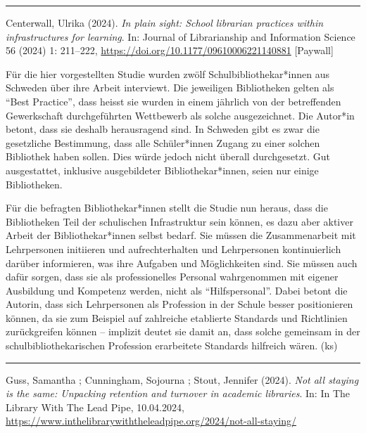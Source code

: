 \documentclass[a4paper,
fontsize=11pt,
oneside,
numbers=noperiodatend,
parskip=half-,
bibliography=totoc,
final
]{scrartcl}
\begin{document}
\begin{center}\rule{0.5\linewidth}{0.5pt}\end{center}

Centerwall, Ulrika (2024). \emph{In plain sight: School librarian
practices within infrastructures for learning}. In: Journal of
Librarianship and Information Science 56 (2024) 1: 211--222,
\url{https://doi.org/10.1177/09610006221140881} {[}Paywall{]}

Für die hier vorgestellten Studie wurden zwölf Schulbibliothekar*innen
aus Schweden über ihre Arbeit interviewt. Die jeweiligen Bibliotheken
gelten als \enquote{Best Practice}, dass heisst sie wurden in einem
jährlich von der betreffenden Gewerkschaft durchgeführten Wettbewerb als
solche ausgezeichnet. Die Autor*in betont, dass sie deshalb herausragend
sind. In Schweden gibt es zwar die gesetzliche Bestimmung, dass alle
Schüler*innen Zugang zu einer solchen Bibliothek haben sollen. Dies
würde jedoch nicht überall durchgesetzt. Gut ausgestattet, inklusive
ausgebildeter Bibliothekar*innen, seien nur einige Bibliotheken.

Für die befragten Bibliothekar*innen stellt die Studie nun heraus, dass
die Bibliotheken Teil der schulischen Infrastruktur sein können, es dazu
aber aktiver Arbeit der Bibliothekar*innen selbst bedarf. Sie müssen die
Zusammenarbeit mit Lehrpersonen initiieren und aufrechterhalten und
Lehrpersonen kontinuierlich darüber informieren, was ihre Aufgaben und
Möglichkeiten sind. Sie müssen auch dafür sorgen, dass sie als
professionelles Personal wahrgenommen mit eigener Ausbildung und
Kompetenz werden, nicht als \enquote{Hilfspersonal}. Dabei betont die
Autorin, dass sich Lehrpersonen als Profession in der Schule besser
positionieren können, da sie zum Beispiel auf zahlreiche etablierte
Standards und Richtlinien zurückgreifen können -- implizit deutet sie
damit an, dass solche gemeinsam in der schulbibliothekarischen
Profession erarbeitete Standards hilfreich wären. (ks)

\begin{center}\rule{0.5\linewidth}{0.5pt}\end{center}

Guss, Samantha ; Cunningham, Sojourna ; Stout, Jennifer (2024).
\emph{Not all staying is the same: Unpacking retention and turnover in
academic libraries}. In: In The Library With The Lead Pipe, 10.04.2024,
\url{https://www.inthelibrarywiththeleadpipe.org/2024/not-all-staying/}
\end{document}
